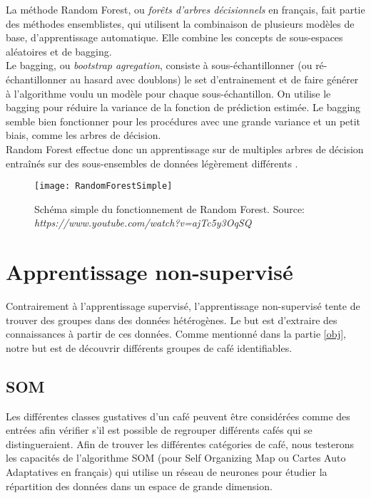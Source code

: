 La méthode Random Forest, ou \textit{forêts d'arbres décisionnels} en français, fait partie des méthodes ensemblistes\cite{EnsembleMethods}, qui utilisent la combinaison de plusieurs modèles de base, d'apprentissage automatique. Elle combine les concepts de sous-espaces aléatoires et de bagging.\\

\noindent Le bagging\label{bagging}, ou \textit{bootstrap agregation}, consiste à sous-échantillonner (ou ré-échantillonner au hasard avec doublons) le set d'entrainement et de faire générer à l’algorithme voulu un modèle pour chaque sous-échantillon. On utilise le bagging pour réduire la variance de la fonction de prédiction estimée. Le bagging semble bien fonctionner pour les procédures avec une grande variance et un petit biais, comme les arbres de décision. \cite{hastie_09_elements-of.statistical-learning}\\


\noindent Random Forest effectue donc un apprentissage sur de multiples arbres de décision entraînés sur des sous-ensembles de données légèrement différents \cite{Statistics01randomforests}.


\begin{figure}[H]
	\texttt{[image: RandomForestSimple]}
	\caption{\label{RandomForestSchema} Schéma simple du fonctionnement de Random Forest. \newline Source: \textit{https://www.youtube.com/watch?v=ajTc5y3OqSQ}}
\end{figure}


\newpage

\section{Apprentissage non-supervisé}
Contrairement à l'apprentissage supervisé, l'apprentissage non-supervisé tente de trouver des groupes dans des données hétérogènes. Le but est d'extraire des connaissances à partir de ces données. Comme mentionné dans la partie \ref{obj}, notre but est de découvrir différents groupes de café identifiables. 


\subsection{SOM}

Les différentes classes gustatives d'un café peuvent être considérées comme des entrées afin vérifier s'il est possible de regrouper différents cafés qui se distingueraient. Afin de trouver les différentes catégories de café, nous testerons les capacités de l'algorithme SOM (pour Self Organizing Map ou Cartes Auto Adaptatives en français) qui utilise un réseau de neurones pour étudier la répartition des données dans un espace de grande dimension. 

